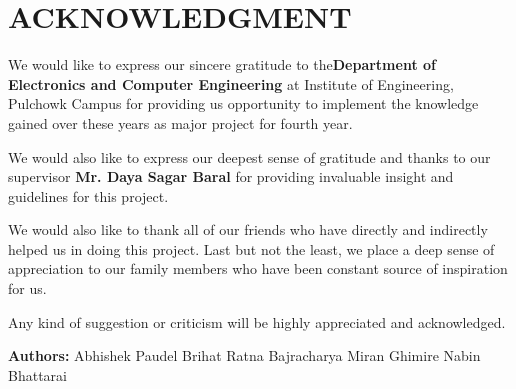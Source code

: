 
\newpage
\section*{ACKNOWLEDGMENT}
We would like to express our sincere gratitude to the ​{\bf Department of Electronics and Computer Engineering} at Institute of Engineering, Pulchowk Campus for providing us opportunity to implement the knowledge gained over these years as major project for fourth year.

We would also like to express our deepest sense of gratitude and thanks to our supervisor {\bf Mr. Daya Sagar Baral} for providing invaluable insight and guidelines for this project.

We would also like to thank all of our friends who have directly and indirectly helped us in doing this project. Last but not the least, we place a deep sense of appreciation to our family members who have been constant source of inspiration for us.

Any kind of suggestion or criticism will be highly appreciated and acknowledged.

\vskip 10mm
{\bf Authors:}
\newline Abhishek Paudel
\newline Brihat Ratna Bajracharya
\newline Miran Ghimire
\newline Nabin Bhattarai
